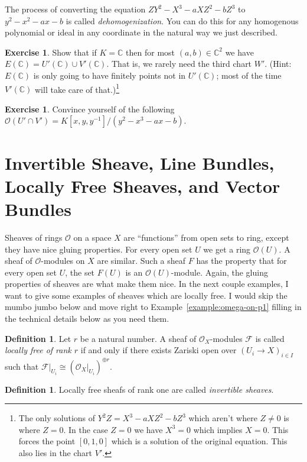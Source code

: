\documentclass[12pt]{article}
\numberwithin{equation}{section}
\theoremstyle{definition}
\newtheorem{definition}[theorem]{Definition}
\newtheorem{exercise}[theorem]{Exercise}
\theoremstyle{remark}
\newcommand{\CC}{\mathbb{C}}
\newcommand{\Ocal}{\mathcal{O}}
\newcommand{\Fcal}{\mathcal{F}}
\begin{document}
The process of converting the equation 
$ZY^2-X^3-aXZ^2-bZ^3$ to $y^2 -x^2-ax-b$ is called \emph{dehomogenization}.
You can do this for any homogenous polynomial or ideal in any coordinate in the natural way we just described.

\begin{exercise}
	Show that if $K = \CC$ then for most $(a,b) \in \CC^2$ we have $E(\CC)= U'(\CC) \cup V'(\CC)$. That is, we rarely need the third chart $W'$. 
	(Hint: $E(\CC)$ is only going to have finitely points not in $U'(\CC)$; most of the time $V'(\CC)$ will take care of that.)\footnote{
		The only solutions of $Y^2Z=X^3-aXZ^2-bZ^3$ which aren't where $Z\neq 0$ is where $Z=0$.
		In the case $Z=0$ we have $X^3=0$ which implies $X=0$.
		This forces the point $[0,1,0]$ which is a solution of the original equation.
		This also lies in the chart $V'$.	
}
\end{exercise}

\begin{exercise}
	Convince yourself of the following $\Ocal(U'\cap V')=K[x,y,y^{-1}]/(y^2-x^3-ax-b)$.
\end{exercise}




\section{Invertible Sheave, Line Bundles, Locally Free Sheaves, and Vector Bundles}
Sheaves of rings $\Ocal$ on a space $X$ are ``functions'' from open sets to ring, except they have nice gluing properties. For every open set $U$ we get a ring $\Ocal(U)$.
A sheaf of $\Ocal$-modules on $X$ are similar. 
Such a sheaf $F$ has the property that for every open set $U$, the set $F(U)$ is an $\Ocal(U)$-module.
Again, the gluing properties of sheaves are what make them nice. 
In the next couple examples, I want to give some examples of sheaves which are locally free. I would skip the mumbo jumbo below and move right to Example~\ref{example:omega-on-p1} filling in the technical details below as you need them. 

\begin{definition}
	Let $r$ be a natural number.
	A sheaf of $\Ocal_X$-modules $\Fcal$ is called \emph{locally free of rank $r$} if and only if there exists Zariski open over $(U_i \to X)_{i \in I}$ such that $\Fcal\vert_{U_i} \cong (\Ocal_X\vert_{U_i})^{\oplus r}$. 
\end{definition}

\begin{definition}
	Locally free sheafs of rank one are called \emph{invertible sheaves}. 
\end{definition}
\end{document}
